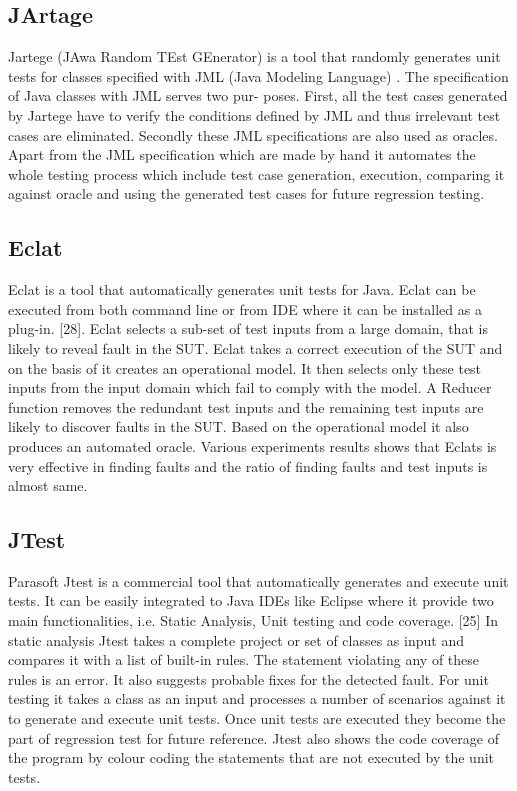 \subsection{JArtage}
Jartege (JAwa Random TEst GEnerator) is a tool that randomly generates unit tests for classes specified with JML (Java Modeling Language) \cite{Oriat2004}. The specification of Java classes with JML serves two pur- poses. First, all the test cases generated by Jartege have to verify the conditions defined by JML and thus irrelevant test cases are eliminated. Secondly these JML specifications are also used as oracles. Apart from the JML specification which are made by hand it automates the whole testing process which include test case generation, execution, comparing it against oracle and using the generated test cases for future regression testing.

\subsection{Eclat}
Eclat \cite{Pacheco2005} is a tool that automatically generates unit tests for Java. Eclat can be executed from both command line or from IDE where it can be installed as a plug-in. [28]. Eclat selects a sub-set of test inputs from a large domain, that is likely to reveal fault in the SUT. Eclat takes a correct execution of the SUT and on the basis of it creates an operational model. It then selects only these test inputs from the input domain which fail to comply with the model. A Reducer function removes the redundant test inputs and the remaining test inputs are likely to discover faults in the SUT. Based on the operational model it also produces an automated oracle. Various experiments results shows that Eclats is very effective in finding faults and the ratio of finding faults and test inputs is almost same.

\subsection{JTest}
Parasoft Jtest is a commercial tool that automatically generates and execute unit tests. It can be easily integrated to Java IDEs like Eclipse where it provide two main functionalities, i.e. Static Analysis, Unit testing and code coverage. [25]
In static analysis Jtest takes a complete project or set of classes as input and compares it with a list of built-in rules. The statement violating any of these rules is an error. It also suggests probable fixes for the detected fault.
For unit testing it takes a class as an input and processes a number of scenarios against it to generate and execute unit tests. Once unit tests are executed they become the part of regression test for future reference.
Jtest also shows the code coverage of the program by colour coding the statements that are not executed by the unit tests.

